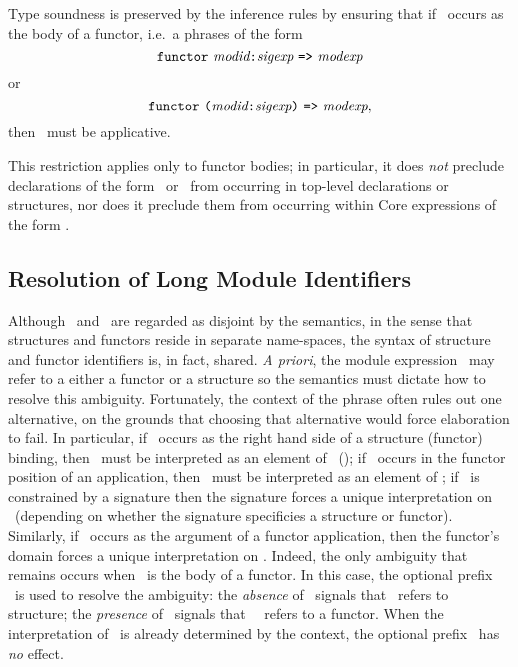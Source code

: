 
Type soundness is preserved by the inference rules by ensuring that if 
\modexp\ occurs as the body of a functor, i.e.\ a phrases of the form
\[ \mbox{{\tt functor}\ {\it modid}{\tt :}{\it sigexp}\ {\tt =>}\ {\it modexp}} \]
or
\[ \mbox{{\tt functor}\ {\tt (}{\it modid}{\tt :}{\it sigexp}{\tt )} {\tt =>}\ {\it modexp}}, \]
then \modexp\ must be applicative. 

This restriction applies only to functor bodies; in particular, it
does {\sl not} preclude declarations
of the form \asstrbind\ or \asfunbind\ from occurring
in top-level declarations or structures,
nor does it preclude them from occurring within Core expressions of
the form .


\subsection{Resolution of Long Module Identifiers}

Although \StrId\ and \FunId\ are regarded as disjoint by the semantics,
in the sense that structures and functors reside in separate name-spaces, 
the syntax of structure and functor identifiers is, in fact, 
shared. {\sl A priori}, the module expression \opp\longmodid\
may refer to a either a functor or a structure so the
semantics must dictate how to resolve this ambiguity. Fortunately,
the context of the phrase often rules out one
alternative, on the grounds that choosing that alternative 
would force elaboration to fail. In particular,
if \opp\longmodid\ occurs as the right hand side of a structure
(functor) binding, then \longmodid\ must be interpreted as an element
of \LongStrId\ (\LongFunId); if
\opp\longmodid\ occurs in the functor position of an application, then
\longmodid\ must be interpreted as an element of \LongFunId; if
\opp\longmodid\ is constrained by a signature
then the signature 
forces a unique interpretation 
on \longmodid\ (depending on whether the signature specificies a structure or functor).
Similarly, if \opp\longmodid\ occurs as the argument of a functor application,
then the functor's domain forces a unique interpretation 
on \longmodid.
Indeed, the only ambiguity that remains occurs when \opp\longmodid\ is the body of a functor. In this case, the optional prefix \opp\ is used to resolve
the ambiguity:  the {\sl absence} of \OP\ signals
that \longmodid\ refers to structure; the {\sl presence} of \OP\ signals that
\OP~\longmodid\ refers to a functor. 
When the interpretation of \opp\longmodid\ is already
determined by the context, the optional prefix \opp\ has {\sl no} effect.

